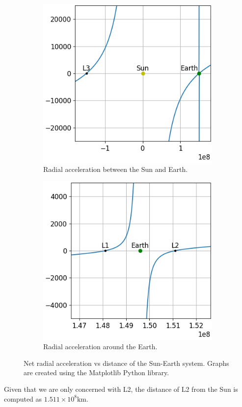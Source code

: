 \begin{figure}[H]
	\centering
	\captionsetup[subfigure]{justification=centering}
	\begin{subfigure}[b]{0.4\textwidth}
		\centering
		\includegraphics[scale=0.6]{figures/xyplot1.png}
		\caption{\footnotesize Radial acceleration between the Sun and Earth.}
		\label{fig:radial-accel-system}
	\end{subfigure}
	\hspace*{1cm}
	\begin{subfigure}[b]{0.4\textwidth}
		\centering
		\includegraphics[scale=0.6]{figures/xyplot2.png}
		\caption{\footnotesize Radial acceleration around the Earth.\vspace*{1.16em}}
		\label{fig:radial-accel-earth}
	\end{subfigure}
	\label{fig:radial-accel}
	\caption{Net radial acceleration vs distance of the Sun-Earth system. Graphs are created using the Matplotlib Python library.}
\end{figure}
Given that we are only concerned with L2, the distance of L2 from the Sun is computed as $1.511 \times 10^8 \si{\kilo\metre}$.


